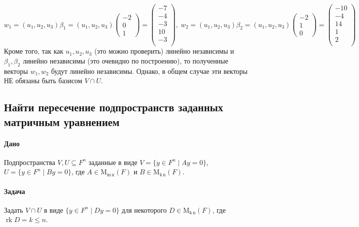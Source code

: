 \documentclass{article}
\newcommand{\MatrixDim}[3]{\operatorname{\mathrm{M}_{#2\,#3}}(#1)}
\newcommand{\rk}{\operatorname{rk}}
\begin{document}
\[
w_1 = (u_1, u_2, u_3) \beta_1 =
(u_1, u_2, u_3) 
\begin{pmatrix}
-2\\0\\1
\end{pmatrix}
=
\begin{pmatrix}
{-7}\\
{-4}\\
{-3}\\
{10}\\
{-3}\\
\end{pmatrix}
,\;
w_2 = (u_1, u_2, u_3) \beta_2 =
(u_1, u_2, u_3) 
\begin{pmatrix}
-2\\1\\0
\end{pmatrix}
=
\begin{pmatrix}
{-10}\\
{-4}\\
{14}\\
{1}\\
{2}\\
\end{pmatrix}
\]
Кроме того, так как $u_1, u_2, u_3$ (это можно проверить) линейно независимы и $\beta_1, \beta_2$ линейно независимы (это очевидно по построению), то полученные векторы $w_1, w_2$ будут линейно независимы. Однако, в общем случае эти векторы НЕ обязаны быть базисом $V\cap U$.

\subsection{Найти пересечение подпространств заданных матричным уравнением}

\paragraph{Дано}

Подпространства $V,U\subseteq F^{n}$ заданные в виде $V = \{y\in F^{n}\mid Ay = 0\}$, $U = \{y\in F^{n}\mid By = 0\}$, где $A\in \MatrixDim{F}{m}{n}$ и $B\in \MatrixDim{F}{k}{n}$.

\paragraph{Задача}

Задать $V\cap U$ в виде $\{y\in F^{n}\mid D y = 0\}$ для некоторого $D\in\MatrixDim{F}{k}{n}$, где $\rk D = k\leqslant n$.
\end{document}
